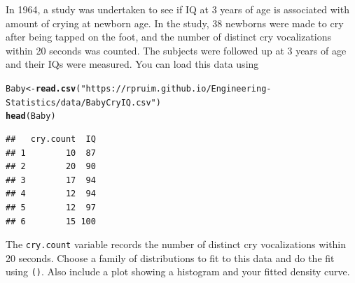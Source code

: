 \documentclass[twoside]{book}\usepackage[]{graphicx}\usepackage[]{xcolor}
\makeatletter
\newcommand{\hlstr}[1]{\textcolor[rgb]{0.192,0.494,0.8}{#1}}%
\newcommand{\hlstd}[1]{\textcolor[rgb]{0.345,0.345,0.345}{#1}}%
\newcommand{\hlkwb}[1]{\textcolor[rgb]{0.69,0.353,0.396}{#1}}%
\newcommand{\hlkwd}[1]{\textcolor[rgb]{0.737,0.353,0.396}{\textbf{#1}}}%
\newenvironment{kframe}{%
 \def\at@end@of@kframe{}%
 \ifinner\ifhmode%
  \def\at@end@of@kframe{\end{minipage}}%
  \begin{minipage}{\columnwidth}%
 \fi\fi%
 \def\FrameCommand##1{\hskip\@totalleftmargin \hskip-\fboxsep
 \colorbox{shadecolor}{##1}\hskip-\fboxsep
     \hskip-\linewidth \hskip-\@totalleftmargin \hskip\columnwidth}%
 \MakeFramed {\advance\hsize-\width
   \@totalleftmargin\z@ \linewidth\hsize
   \@setminipage}}%
 {\par\unskip\endMakeFramed%
 \at@end@of@kframe}
\newenvironment{knitrout}{}{} %
\newcommand{\variable}[1]{{\color{green!50!black}\texttt{#1}}}
\newcommand{\Rindex}[1]{\index{\texttt{#1}}}
\newcommand{\dataframe}[1]{{\color{blue!80!black}\texttt{#1}}\Rindex{#1}}
\newcommand{\function}[1]{{\color{purple!75!blue}\texttt{\StrSubstitute{#1}{()}{}()}}\Rindex{#1}}
\makeatother
\begin{document}
\begin{problem}
	In 1964, a study was undertaken to see if IQ at 3 years of age is
	associated with amount of crying at newborn age. In the study, 38 newborns
	were made to cry after being tapped on the foot, and the number of distinct
	cry vocalizations within 20 seconds was counted.
	The subjects were followed up at 3 years of age and their IQs were measured.
	You can load this data using
\begin{knitrout}
\color{fgcolor}\begin{kframe}
\begin{alltt}
\hlstd{Baby} \hlkwb{<-} \hlkwd{read.csv}\hlstd{(}\hlstr{"https://rpruim.github.io/Engineering-Statistics/data/BabyCryIQ.csv"}\hlstd{)}
\hlkwd{head}\hlstd{(Baby)}
\end{alltt}
\begin{verbatim}
##   cry.count  IQ
## 1        10  87
## 2        20  90
## 3        17  94
## 4        12  94
## 5        12  97
## 6        15 100
\end{verbatim}
\end{kframe}
\end{knitrout}

	The \variable{cry.count} variable records the number of distinct cry vocalizations 
	within 20 seconds.  Choose a family of distributions to fit to this data
	and do the fit using \function{fitdistr()}. Also include a plot showing 
	a histogram and your fitted density curve.
\end{problem}
\end{document}
